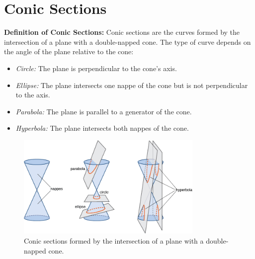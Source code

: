 \documentclass{article}
\begin{document}
\renewcommand{\familydefault}{\rmdefault}



\setcounter{page}{0}
\newpage
\tableofcontents
\newpage



\section*{Conic Sections}

\begin{conceptbox}
\textbf{Definition of Conic Sections:}  
Conic sections are the curves formed by the intersection of a plane with a double-napped cone. The type of curve depends on the angle of the plane relative to the cone:
\begin{itemize}
    \item \textit{Circle:} The plane is perpendicular to the cone's axis.
    \item \textit{Ellipse:} The plane intersects one nappe of the cone but is not perpendicular to the axis.
    \item \textit{Parabola:} The plane is parallel to a generator of the cone.
    \item \textit{Hyperbola:} The plane intersects both nappes of the cone.
\end{itemize}
\begin{figure}[H]
    \centering
    \includegraphics[width=0.8\textwidth]{double-napped cone to 2D shapes.png}
    \caption{Conic sections formed by the intersection of a plane with a double-napped cone.}
\end{figure}
\end{conceptbox}
\end{document}
